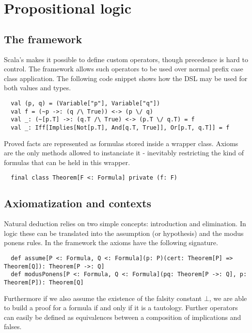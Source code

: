\documentclass[acmlarge]{acmart}
\begin{document}
\section{Propositional logic}

\subsection{The framework}



Scala's makes it possible to define custom operators, though precedence is hard to control. The framework allows such operators to be used over normal prefix case class application. The following code snippet shows how the DSL may be used for both values and types.

\begin{verbatim}
  val (p, q) = (Variable["p"], Variable["q"])
  val f = (~p ->: (q /\ True)) <-> (p \/ q)
  val _: (~[p.T] ->: (q.T /\ True) <-> (p.T \/ q.T) = f
  val _: Iff[Implies[Not[p.T], And[q.T, True]], Or[p.T, q.T]] = f
\end{verbatim}

Proved facts are represented as formulas stored inside a wrapper class. Axioms are the only methods allowed to instanciate it - inevitably restricting the kind of formulas that can be held in this wrapper.

\begin{verbatim}
  final class Theorem[F <: Formula] private (f: F)
\end{verbatim}

\subsection{Axiomatization and contexts}

Natural deduction relies on two simple concepts: introduction and elimination. In logic these can be translated into the assumption (or hypothesis) and the modus ponens rules. In the framework the axioms have the following signature.

\begin{verbatim}
  def assume[P <: Formula, Q <: Formula](p: P)(cert: Theorem[P] => Theorem[Q]): Theorem[P ->: Q]
  def modusPonens[P <: Formula, Q <: Formula](pq: Theorem[P ->: Q], p: Theorem[P]): Theorem[Q]
\end{verbatim}

Furthermore if we also assume the existence of the falsity constant $\bot$, we are able to build a proof for a formula if and only if it is a tautology. Further operators can easily be defined as equivalences between a composition of implications and falses.
\end{document}
